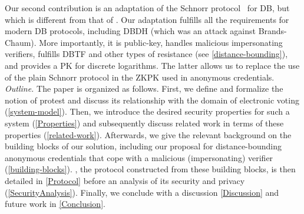 Our second contribution is an adaptation of the Schnorr protocol~\cite{Schnorr} 
for \ac{DB}, but which is different from that of \textcite{DistanceBounding}.
Our adaptation fulfills all the requirements for modern \ac{DB} protocols, including \ac{DBDH} (which was an attack against Brands-Chaum).
More importantly, it is public-key, handles malicious impersonating verifiers, fulfills \ac{DBTF} and other types of resistance (see \cref{distance-bounding}), and provides a \ac{PK} for discrete logarithms.
The latter allows us to replace the use of the plain Schnorr protocol in the \ac{ZKPK} used in anonymous credentials.
\emph{Outline.} 
The paper is organized as follows. 
First, we define and formalize the notion of protest and discuss its relationship with the domain of electronic voting (\cref{system-model}).  
Then, we introduce the desired security properties for such a system (\cref{Properties}) and subsequently discuss related work in 
terms of these properties (\cref{related-work}). 
Afterwards, we give the relevant background on the building blocks of our solution, including our proposal for distance-bounding anonymous credentials that cope with a malicious (impersonating) verifier (\cref{building-blocks}). 
\PRIVO, the protocol constructed from these building blocks, is then detailed in \cref{Protocol} before an analysis of its security and privacy (\cref{SecurityAnalysis}). 
Finally, we conclude with a discussion \cref{Discussion} and future work in \cref{Conclusion}.
